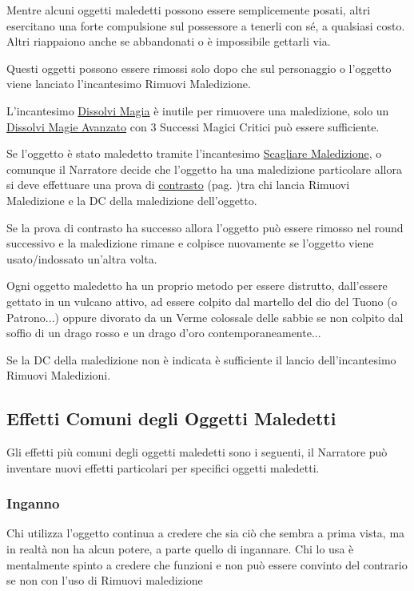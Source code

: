 \begin{multicols}{2}
Mentre alcuni oggetti maledetti possono essere semplicemente posati, altri esercitano una forte compulsione sul possessore a tenerli con sé, a qualsiasi costo. Altri riappaiono anche se abbandonati o è impossibile gettarli via.

Questi oggetti possono essere rimossi solo dopo che sul personaggio o l'oggetto viene lanciato l'incantesimo Rimuovi Maledizione.

L'incantesimo \hyperlink{Dissolvi Magie}{Dissolvi Magia} è inutile per rimuovere una maledizione, solo un \hyperlink{Dissolvi Magie Avanzato}{Dissolvi Magie Avanzato} con 3 Successi Magici Critici può essere sufficiente.

Se l'oggetto è stato maledetto tramite l'incantesimo \hyperlink{Scagliare Maledizione}{Scagliare Maledizione}, o comunque il Narratore decide che l'oggetto ha una maledizione particolare allora si deve effettuare una prova di \hyperlink{contrastareincantesimi}{contrasto} (pag. \pageref{contrastareincantesimi})tra chi lancia Rimuovi Maledizione e la DC della maledizione dell'oggetto.

Se la prova di contrasto ha successo allora l'oggetto può essere rimosso nel round successivo e la maledizione rimane e colpisce nuovamente se l'oggetto viene usato/indossato un'altra volta.

Ogni oggetto maledetto ha un proprio metodo per essere distrutto, dall'essere gettato in un vulcano attivo, ad essere colpito dal martello del dio del Tuono (o Patrono...) oppure divorato da un Verme colossale delle sabbie se non colpito dal soffio di un drago rosso e un drago d'oro contemporaneamente...

Se la DC della maledizione non è indicata è sufficiente il lancio dell'incantesimo Rimuovi Maledizioni.

\subsection{Effetti Comuni degli Oggetti Maledetti}

Gli effetti più comuni degli oggetti maledetti sono i seguenti, il Narratore può inventare nuovi effetti particolari per specifici oggetti maledetti.

\subsubsection{Inganno}

Chi utilizza l'oggetto continua a credere che sia ciò che sembra a prima vista, ma in realtà non ha alcun potere, a parte quello di ingannare. Chi lo usa è mentalmente spinto a credere che funzioni e non può essere convinto del contrario se non con l'uso di Rimuovi maledizione


\end{multicols}
